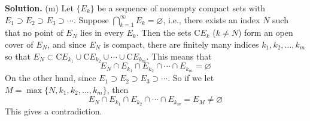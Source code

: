 \documentclass[12pt]{article}
\theoremstyle{definition}
\begin{document}
\smallskip
\noindent\textbf{Solution.}\quad
(m) Let $\{E_k\}$ be a sequence of nonempty compact sets with $E_1\supset E_2\supset E_3\supset\cdots$. Suppose $\bigcap_{k=1}^\infty E_k=\varnothing$, i.e., there exists an index $N$ such that no point of $E_N$ lies in every $E_k$. Then the sets $\mathrm{C}E_k$ ($k\ne N$) form an open cover of $E_N$, and since $E_N$ is compact, there are finitely many indices $k_1,k_2,\ldots,k_m$ so that $E_N\subset \mathrm{C}E_{k_1}\cup\mathrm{C}E_{k_2}\cup\cdots\cup\mathrm{C}E_{k_m}$. This means that 
$$
E_N\cap E_{k_1}\cap E_{k_2}\cap\cdots\cap E_{k_m}=\varnothing
$$
On the other hand, since $E_1\supset E_2\supset E_3\supset\cdots$. So if we let $M=\max\{N,k_1,k_2,\ldots,k_m\}$, then
$$
E_N\cap E_{k_1}\cap E_{k_2}\cap\cdots\cap E_{k_m}=E_M\ne\varnothing
$$
This gives a contradiction.
\end{document}

